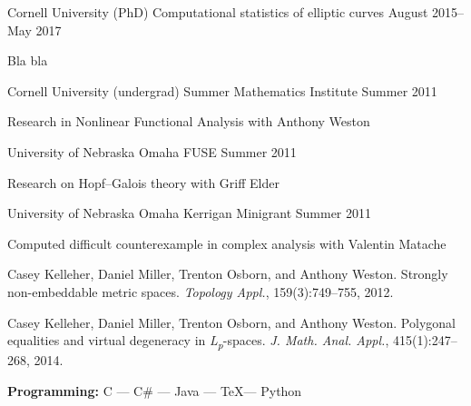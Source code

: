 \documentclass[11pt, letterpaper]{awesome-cv}
\begin{document}
\begin{cventries}

\cventry
	{Cornell University (PhD)}
	{Computational statistics of elliptic curves}
	{}
	{August 2015--May 2017}
	{
		\begin{cvitems}
			\item{Bla bla}
		\end{cvitems}
	}
	
\cventry
	{Cornell University (undergrad)}
	{Summer Mathematics Institute}
	{}
	{Summer 2011}
	{
		\begin{cvitems}
			\item{Research in Nonlinear Functional Analysis with Anthony Weston}
		\end{cvitems}
	}

\cventry
	{University of Nebraska Omaha}
	{FUSE}
	{}
	{Summer 2011}
	{
		\begin{cvitems}
			\item{Research on Hopf--Galois theory with Griff Elder}
		\end{cvitems}
	}
	
\cventry
	{University of Nebraska Omaha}
	{Kerrigan Minigrant}
	{}
	{Summer 2011}
	{
		\begin{cvitems}
			\item{Computed difficult counterexample in complex analysis with Valentin Matache}
		\end{cvitems}
	}
	
\end{cventries}

\begin{cvparagraph}

Casey Kelleher, Daniel Miller, Trenton Osborn, and Anthony Weston. Strongly non-embeddable metric spaces. \emph{Topology Appl.}, 159(3):749--755, 2012. 

Casey Kelleher, Daniel Miller, Trenton Osborn, and Anthony Weston. Polygonal equalities and virtual degeneracy in \emph{L\textsubscript{p}}-spaces. \emph{J. Math. Anal. Appl.}, 415(1):247--268, 2014. 
\end{cvparagraph}






\begin{cvparagraph}

\textbf{Programming:} C --- C\# --- Java --- \TeX --- Python
\end{cvparagraph}
\end{document}
